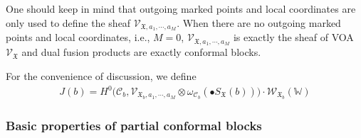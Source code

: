 \documentclass[11pt,b5paper,notitlepage]{article}
\theoremstyle{definition}
\theoremstyle{plain}
\newcommand{\SV}{\mathscr{V}}
\newcommand{\blt}{\bullet}
\newcommand{\Wbb}{\mathbb W}
\newcommand{\<}{\left\langle}
\renewcommand{\>}{\right\rangle}
\newcommand{\MC}{\mathcal{C}}
\newcommand{\fx}{\mathfrak{X}}
\newcommand{\SW}{\mathscr{W}}
\numberwithin{equation}{subsection}
\begin{document}
 
One should keep in mind that outgoing marked points and local coordinates are only used to define the sheaf $\SV_{\fx,a_1,\cdots,a_M}$. When there are no outgoing marked points and local coordinates, i.e., $M=0$, $\SV_{\fx,a_1,\cdots,a_M}$ is exactly the sheaf of VOA $\SV_\fx$ and dual fusion products are exactly conformal blocks.

For the convenience of discussion, we define 
\begin{gather}\label{eq21}
J(b)=H^0\big(\MC_b,\SV_{\fx_b,a_1,\cdots,a_M}\otimes \omega_{\MC_b}(\blt S_\fx(b))\big)\cdot \SW_{\fx_b}(\Wbb)
\end{gather}
 

\subsubsection{Basic properties of partial conformal blocks}

 
\end{document}
